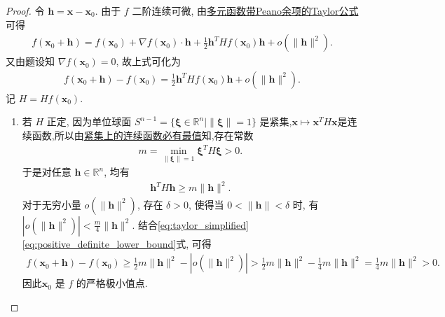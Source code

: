 \documentclass[../../main.tex]{subfiles}%
\begin{document}
\begin{proof}
令 \( \bm{h} = \bm{x} - \bm{x}_0 \). 由于 \( f \) 二阶连续可微, 由\hyperref[theorem:多元函数带Peano余项的Taylor公式]{多元函数带Peano余项的Taylor公式}可得
\begin{align*}
f(\bm{x}_0 + \bm{h}) = f(\bm{x}_0) + \nabla f(\bm{x}_0) \cdot \bm{h} + \frac{1}{2} \bm{h}^T Hf(\bm{x}_0) \bm{h} + o(\|\bm{h}\|^2). 
\end{align*}
又由题设知 \( \nabla f(\bm{x}_0) = 0 \), 故上式可化为
\begin{align}
f(\bm{x}_0 + \bm{h}) - f(\bm{x}_0) = \frac{1}{2} \bm{h}^T Hf(\bm{x}_0) \bm{h} + o(\|\bm{h}\|^2). \label{eq:taylor_simplified}
\end{align}
记 \( H = Hf(\bm{x}_0) \).
\begin{enumerate}[(1)]
\item 若 \( H \) 正定, 因为单位球面 \( S^{n-1} = \{ \bm{\xi} \in \mathbb{R}^n \mid \|\bm{\xi}\| = 1 \} \) 是紧集,$\bm{x}\mapsto \bm{x}^TH\bm{x}$是连续函数,所以由\hyperref[Functional Analysis-proposition:紧集上的连续函数必有最值]{紧集上的连续函数必有最值}知,存在常数
\begin{align*}
m = \min_{\|\bm{\xi}\| = 1} \bm{\xi}^T H \bm{\xi} > 0.
\end{align*}
于是对任意 \( \bm{h} \in \mathbb{R}^n \), 均有
\begin{align}
\bm{h}^T H \bm{h} \geqslant m \|\bm{h}\|^2. \label{eq:positive_definite_lower_bound}
\end{align}
对于无穷小量 \( o(\|\bm{h}\|^2) \), 存在 \( \delta > 0 \), 使得当 \( 0 < \|\bm{h}\| < \delta \) 时, 有 \( |o(\|\bm{h}\|^2)| < \frac{m}{4} \|\bm{h}\|^2 \). 结合\eqref{eq:taylor_simplified}\eqref{eq:positive_definite_lower_bound}式, 可得
\begin{align*}
f(\bm{x}_0 + \bm{h}) - f(\bm{x}_0)  \geqslant \frac{1}{2} m \|\bm{h}\|^2 - |o(\|\bm{h}\|^2)| 
> \frac{1}{2} m \|\bm{h}\|^2 - \frac{1}{4} m \|\bm{h}\|^2 = \frac{1}{4} m \|\bm{h}\|^2 > 0.
\end{align*}
因此\( \bm{x}_0 \) 是 \( f \) 的严格极小值点.


\end{enumerate}
\end{proof}
\end{document}
